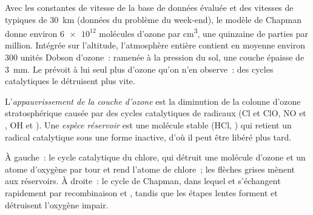 Avec les constantes de vitesse de la base de données évaluée et des
vitesses de  typiques de
\qty{30}{km} (données du problème du week-end), le modèle de Chapman
donne environ
$\num{6e12}$ molécules d'ozone par \unit{cm^3}, une quinzaine de parties par
million. Intégrée sur l'altitude, l'atmosphère entière contient en
moyenne environ 300 unités Dobson d'ozone~: ramenée à la pression du sol,
une couche épaisse de \qty{3}{mm}. Le  prévoit à lui
seul plus d'ozone qu'on n'en observe~: des cycles catalytiques le
détruisent plus vite.

\begin{definition}\label{def:b3:photochemistry:ozone-depletion}
L'\emph{appauvrissement de la couche d'ozone} est la
diminution de la colonne d'ozone stratosphérique causée par des cycles
catalytiques de radicaux (Cl et ClO,
NO et , OH et ). Une \emph{espèce réservoir}
est une molécule stable (HCl, ) qui retient un radical
catalytique sous une forme inactive, d'où il peut être libéré plus tard.
\end{definition}

\begin{omfigure}

{\small À gauche~: le cycle catalytique du chlore, qui détruit une
molécule d'ozone et un atome d'oxygène par tour et rend l'atome de
chlore~; les flèches grises mènent aux réservoirs. À droite~: le cycle de
Chapman, dans lequel  et  s'échangent rapidement par
recombinaison et , tandis que les étapes lentes forment et
détruisent l'oxygène impair.}
\end{omfigure}

